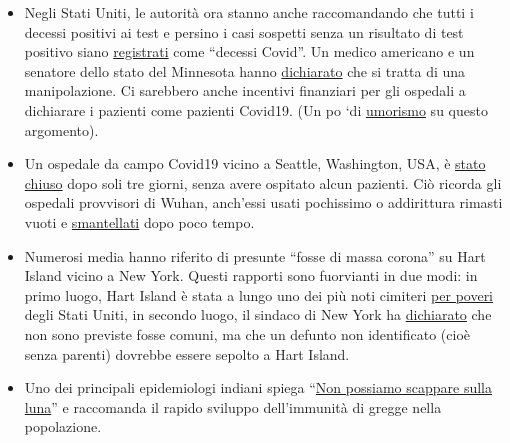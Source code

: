 \begin{itemize}
\tightlist
\item
  Negli Stati Uniti, le autorità ora stanno anche raccomandando che
  tutti i decessi positivi ai test e persino i casi sospetti senza un
  risultato di test positivo siano
  \href{https://nypost.com/2020/04/07/feds-classify-all-coronavirus-patient-deaths-as-covid-19-deaths/?link=TD_mansionglobal_new_mansion_global.11147f181987fd93}{registrati}
  come ``decessi Covid''. Un medico americano e un senatore dello stato
  del Minnesota hanno
  \href{https://www.valleynewslive.com/content/misc/Sen-Dr-Jensens-Shocking-Admission-About-Coronavirus-569458361.html}{dichiarato}
  che si tratta di una manipolazione. Ci sarebbero anche incentivi
  finanziari per gli ospedali a dichiarare i pazienti come pazienti
  Covid19. (Un po `di
  \href{https://swprs.files.wordpress.com/2020/04/cv-2019-2020.jpg}{umorismo}
  su questo argomento).
\item
  Un ospedale da campo Covid19 vicino a Seattle, Washington, USA, è
  \href{https://www.yahoo.com/news/armys-seattle-field-hospital-closes-165646379.html}{stato
  chiuso} dopo soli tre giorni, senza avere ospitato alcun pazienti. Ciò
  ricorda gli ospedali provvisori di Wuhan, anch'essi usati pochissimo o
  addirittura rimasti vuoti e
  \href{https://www.theguardian.com/world/2020/feb/12/what-chinas-empty-new-coronavirus-hospitals-say-about-its-secretive-system}{smantellati}
  dopo poco tempo.
\item
  Numerosi media hanno riferito di presunte ``fosse di massa corona'' su
  Hart Island vicino a New York. Questi rapporti sono fuorvianti in due
  modi: in primo luogo, Hart Island è stata a lungo uno dei più noti
  cimiteri
  \href{https://en.wikipedia.org/wiki/Hart_Island_(Bronx)\#Cemetery}{per
  poveri} degli Stati Uniti, in secondo luogo, il sindaco di New York ha
  \href{https://www.independent.co.uk/news/world/americas/new-york-coronavirus-cases-burials-bodies-covid-19-hart-island-a9459956.html}{dichiarato}
  che non sono previste fosse comuni, ma che un defunto non identificato
  (cioè senza parenti) dovrebbe essere sepolto a Hart Island.
\item
  Uno dei principali epidemiologi indiani spiega
  ``\href{https://www.business-standard.com/article/current-affairs/we-cannot-run-away-to-the-moon-need-to-develop-herd-immunity-dr-muliyil-120040601232_1.html}{Non
  possiamo scappare sulla luna}'' e raccomanda il rapido sviluppo
  dell'immunità di gregge nella popolazione.
\end{itemize}


